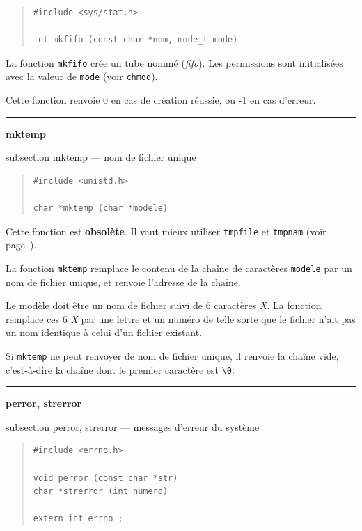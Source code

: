 \documentclass [twoside] {report}
\newcommand {\primitive} [1]
    {
	\phantomsection
	{\large \textbf {#1}}
	\addcontentsline {toc} {subsection} {#1}
    }
\newcommand {\separation}
    {
	\vspace {5mm}
	\nopagebreak
	\hrule
    }
\begin{document}
\begin {quote}
\begin {verbatim}
#include <sys/stat.h>

int mkfifo (const char *nom, mode_t mode)
\end{verbatim}
\end {quote}

La fonction \texttt {mkfifo} crée un tube nommé (\emph {fifo}).
Les permissions sont initialisées avec la valeur de \texttt {mode}
(voir \texttt {chmod}).

Cette fonction renvoie 0 en cas de création
réussie, ou -1 en cas d'erreur.




\separation 
\primitive {mktemp} --- nom de fichier unique

\begin {quote}
\begin {verbatim}
#include <unistd.h>

char *mktemp (char *modele)
\end{verbatim}
\end {quote}

Cette fonction est \textbf {obsolète}. Il vaut mieux utiliser \texttt {tmpfile} et
\texttt {tmpnam} (voir page~\pageref {tmpfile}).

La fonction \texttt {mktemp} remplace le contenu de la chaîne de
caractères \texttt {modele} par un nom de fichier unique, et
renvoie l'adresse de la chaîne.

Le modèle doit être un nom de fichier suivi de 6 caractères
\textit {X}. La fonction remplace ces 6 \textit {X} par une lettre et un
numéro de telle sorte que le fichier n'ait pas un nom
identique à celui d'un fichier existant.

Si \texttt {mktemp} ne peut renvoyer de nom de fichier unique, il
renvoie la chaîne vide, c'est-à-dire la chaîne dont le
premier caractère est \verb:\0:.




\separation 
\primitive {perror, strerror} --- messages d'erreur du système

\begin {quote}
\begin {verbatim}
#include <errno.h>

void perror (const char *str)
char *strerror (int numero)

extern int errno ;
\end{verbatim}
\end {quote}
\end{document}
